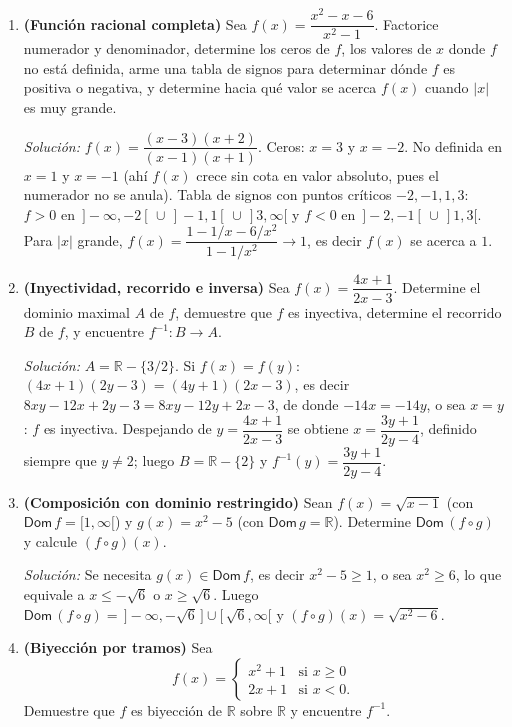 \documentclass[11pt]{article}
\begin{document}
\begin{enumerate}[label=\arabic*.]
\item \textbf{(Función racional completa)} Sea $f(x) = \dfrac{x^2-x-6}{x^2-1}$. Factorice
numerador y denominador, determine los ceros de $f$, los valores de $x$ donde $f$ no está
definida, arme una tabla de signos para determinar dónde $f$ es positiva o negativa, y determine
hacia qué valor se acerca $f(x)$ cuando $|x|$ es muy grande.

\textit{Solución:} $f(x) = \dfrac{(x-3)(x+2)}{(x-1)(x+1)}$. Ceros: $x=3$ y $x=-2$. No definida en
$x=1$ y $x=-1$ (ahí $f(x)$ crece sin cota en valor absoluto, pues el numerador no se anula). Tabla
de signos con puntos críticos $-2,-1,1,3$: $f>0$ en $\,]-\infty,-2[\,\cup\,]-1,1[\,\cup\,]3,\infty[$
y $f<0$ en $\,]-2,-1[\,\cup\,]1,3[$. Para $|x|$ grande,
$f(x) = \dfrac{1-1/x-6/x^2}{1-1/x^2} \to 1$, es decir $f(x)$ se acerca a $1$.

\item \textbf{(Inyectividad, recorrido e inversa)} Sea $f(x) = \dfrac{4x+1}{2x-3}$. Determine el
dominio maximal $A$ de $f$, demuestre que $f$ es inyectiva, determine el recorrido $B$ de $f$, y
encuentre $f^{-1}:B\to A$.

\textit{Solución:} $A=\mathbb{R}-\{3/2\}$. Si $f(x)=f(y)$: $(4x+1)(2y-3)=(4y+1)(2x-3)$, es decir
$8xy-12x+2y-3 = 8xy-12y+2x-3$, de donde $-14x=-14y$, o sea $x=y$: $f$ es inyectiva. Despejando de
$y=\dfrac{4x+1}{2x-3}$ se obtiene $x=\dfrac{3y+1}{2y-4}$, definido siempre que $y\neq2$; luego
$B=\mathbb{R}-\{2\}$ y $f^{-1}(y)=\dfrac{3y+1}{2y-4}$.

\item \textbf{(Composición con dominio restringido)} Sean $f(x)=\sqrt{x-1}$ (con
$\mathsf{Dom}\,f=[1,\infty[$) y $g(x)=x^2-5$ (con $\mathsf{Dom}\,g=\mathbb{R}$). Determine
$\mathsf{Dom}\,(f\circ g)$ y calcule $(f\circ g)(x)$.

\textit{Solución:} Se necesita $g(x)\in\mathsf{Dom}\,f$, es decir $x^2-5\ge1$, o sea $x^2\ge6$, lo
que equivale a $x\le-\sqrt6$ o $x\ge\sqrt6$. Luego
$\mathsf{Dom}\,(f\circ g)=\,]-\infty,-\sqrt6\,]\cup[\,\sqrt6,\infty[$ y
$(f\circ g)(x) = \sqrt{x^2-6}$.

\item \textbf{(Biyección por tramos)} Sea
$$f(x) = \begin{cases} x^2+1 & \text{si } x\ge0 \\ 2x+1 & \text{si } x<0. \end{cases}$$
Demuestre que $f$ es biyección de $\mathbb{R}$ sobre $\mathbb{R}$ y encuentre $f^{-1}$.


\end{enumerate}
\end{document}
